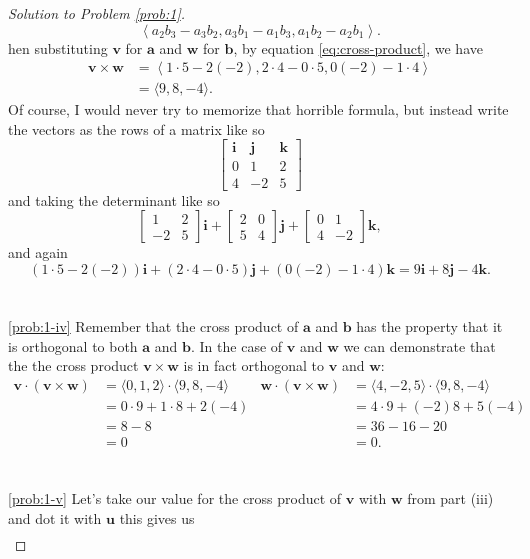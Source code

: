 \documentclass[12pt]{article}
\theoremstyle{plain}
\theoremstyle{definition}
\theoremstyle{remark}
\newcommand{\bfa}{\mathbf{a}}
\newcommand{\bfb}{\mathbf{b}}
\newcommand{\bfu}{\mathbf{u}}
\newcommand{\bfv}{\mathbf{v}}
\newcommand{\bfw}{\mathbf{w}}
\begin{document}
\begin{proof}[Solution to Problem \ref{prob:1}]
\begin{equation}
\left<a_2b_3-a_3b_2,a_3b_1-a_1b_3,a_1b_2-a_2b_1\right>.
\end{equation}
hen substituting $\bfv$ for $\bfa$ and $\bfw$ for $\bfb$, by equation
\ref{eq:cross-product}, we have
\begin{align*}
\bfv\times\bfw&=
\left<1\cdot 5-2(-2),2\cdot 4-0\cdot 5,0(-2)-1\cdot 4\right>\\
&=\boxed{\langle 9,8,-4\rangle.}
\end{align*}
Of course, I would never try to memorize that horrible formula, but instead
write the vectors as the rows of a matrix like so
\[
\begin{bmatrix}
\mathbf{i}&\mathbf{j}&\mathbf{k}\\
0&1&2\\
4&-2&5
\end{bmatrix}
\]
and taking the determinant like so
\[
\begin{bmatrix}
1&2\\
-2&5
\end{bmatrix}
\mathbf{i}
+
\begin{bmatrix}
2&0\\
5&4
\end{bmatrix}
\mathbf{j}
+
\begin{bmatrix}
0&1\\
4&-2
\end{bmatrix}
\mathbf{k},
\]
and again
\[
(1\cdot 5-2(-2))\mathbf{i}+(2\cdot 4-0\cdot 5)\mathbf{j}+(0(-2)-1\cdot
4)\mathbf{k}=\boxed{9\mathbf{i}+8\mathbf{j}-4\mathbf{k}.}
\]
\\\\
\ref{prob:1-iv} Remember that the cross product of $\bfa$ and $\bfb$ has
the property that it is orthogonal to both $\bfa$ and $\bfb$. In the case
of $\bfv$ and $\bfw$ we can demonstrate that the the cross product
$\bfv\times\bfw$ is in fact orthogonal to $\bfv$ and $\bfw$:
\begin{align*}
\bfv\cdot(\bfv\times\bfw)
&=\langle 0,1,2\rangle
\cdot
\langle 9,8,-4\rangle&
\bfw\cdot(\bfv\times\bfw)
&=\langle 4,-2,5\rangle
\cdot
\langle 9,8,-4\rangle\\
&=0\cdot 9+1\cdot 8+2(-4)&&=4\cdot 9+(-2)8+5(-4)\\
&=8-8&&=36-16-20\\
&=0&&=0.
\end{align*}
\\\\
\ref{prob:1-v} Let's take our value for the cross product of $\bfv$ with
$\bfw$ from part (iii) and dot it with $\bfu$ this gives us
\begin{align*}

\end{align*}
\end{proof}
\end{document}
